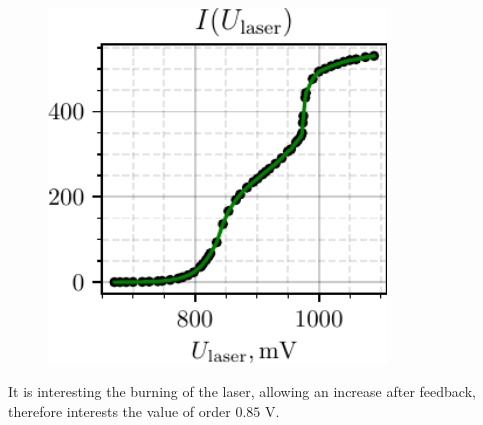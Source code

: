 \begin{minipage}{0.51\textwidth}
   \begin{figure}[h]
       \centering
       \includegraphics[width=0.8\textwidth]{figures/plot_addition.pdf}
   \end{figure}
   
\end{minipage}
\hfill
\begin{minipage}{0.45\textwidth}
    \begin{center}
    \end{center}
\end{minipage}

\phantom{42}

It is interesting the burning of the laser, allowing an increase after feedback, therefore interests the value of order $0.85$ V.